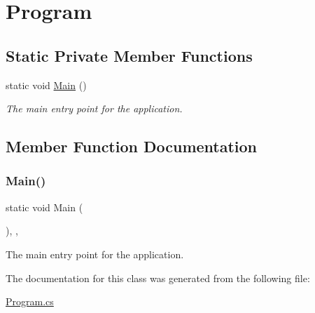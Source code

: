 \hypertarget{classWildlifeTrackingApp_1_1Program}{}\section{Program}
\label{classWildlifeTrackingApp_1_1Program}
\subsection*{Static Private Member Functions}
\begin{DoxyCompactItemize}
\item 
static void \hyperlink{classWildlifeTrackingApp_1_1Program_a2e67222db1dca5be5f3731ada487dd0f}{Main} ()
\begin{DoxyCompactList}\small\item\em The main entry point for the application. \end{DoxyCompactList}\end{DoxyCompactItemize}


\subsection{Member Function Documentation}
\mbox{\label{classWildlifeTrackingApp_1_1Program_a2e67222db1dca5be5f3731ada487dd0f}} 
\subsubsection{\texorpdfstring{Main()}{Main()}}
{\footnotesize\ttfamily static void Main (\begin{DoxyParamCaption}{ }\end{DoxyParamCaption})\hspace{0.3cm}{\ttfamily [inline]}, {\ttfamily [static]}, {\ttfamily [private]}}



The main entry point for the application. 



The documentation for this class was generated from the following file\+:\begin{DoxyCompactItemize}
\item 
\hyperlink{Program_8cs}{Program.\+cs}\end{DoxyCompactItemize}
